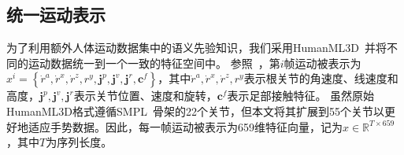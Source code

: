\subsection{统一运动表示}
\label{sec:method:m_rep:unified}
为了利用额外人体运动数据集中的语义先验知识，我们采用HumanML3D~\cite{guo2022humanml3d}并将不同的运动数据统一到一个一致的特征空间中。
参照~\cite{yang2024freetalker,guo2022humanml3d}，第$i$帧运动被表示为$x^i=\left\{\dot{r}^a, \dot{r}^x, \dot{r}^z, r^y, \mathbf{j}^p, \mathbf{j}^v, \mathbf{j}^r, \mathbf{c}^f\right\}$，其中$\dot{r}^a, \dot{r}^x, \dot{r}^z, r^y$表示根关节的角速度、线速度和高度，$\mathbf{j}^p, \mathbf{j}^v, \mathbf{j}^r$表示关节位置、速度和旋转，$\mathbf{c}^f$表示足部接触特征。
虽然原始HumanML3D格式遵循SMPL~\cite{loper2023smpl}骨架的22个关节，但本文将其扩展到55个关节以更好地适应手势数据。因此，每一帧运动被表示为659维特征向量，记为$x \in \mathbb{R}^{T\times 659}$，其中$T$为序列长度。


